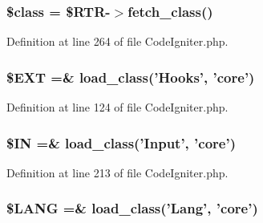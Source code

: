 \hypertarget{_code_igniter_8php_a252ba022809910ea710a068fc1bab657}{
\subsubsection[{\$class}]{\setlength{\rightskip}{0pt plus 5cm}\$class = \$R\-T\-R-\/$>$fetch\-\_\-class()}}\label{_code_igniter_8php_a252ba022809910ea710a068fc1bab657}


Definition at line 264 of file Code\-Igniter.\-php.

\hypertarget{_code_igniter_8php_ab97aae9bc0aae04b84d360a29a3c035b}{
\subsubsection[{\$\-E\-X\-T}]{\setlength{\rightskip}{0pt plus 5cm}\${\bf E\-X\-T} =\& load\-\_\-class('Hooks', 'core')}}\label{_code_igniter_8php_ab97aae9bc0aae04b84d360a29a3c035b}


Definition at line 124 of file Code\-Igniter.\-php.

\hypertarget{_code_igniter_8php_a66d076d48aff75a01bb726f5bdd94d46}{
\subsubsection[{\$\-I\-N}]{\setlength{\rightskip}{0pt plus 5cm}\$I\-N =\& load\-\_\-class('Input', 'core')}}\label{_code_igniter_8php_a66d076d48aff75a01bb726f5bdd94d46}


Definition at line 213 of file Code\-Igniter.\-php.

\hypertarget{_code_igniter_8php_afab4eb732acc05cebf41e0afce18681c}{
\subsubsection[{\$\-L\-A\-N\-G}]{\setlength{\rightskip}{0pt plus 5cm}\$L\-A\-N\-G =\& load\-\_\-class('Lang', 'core')}}\label{_code_igniter_8php_afab4eb732acc05cebf41e0afce18681c}


